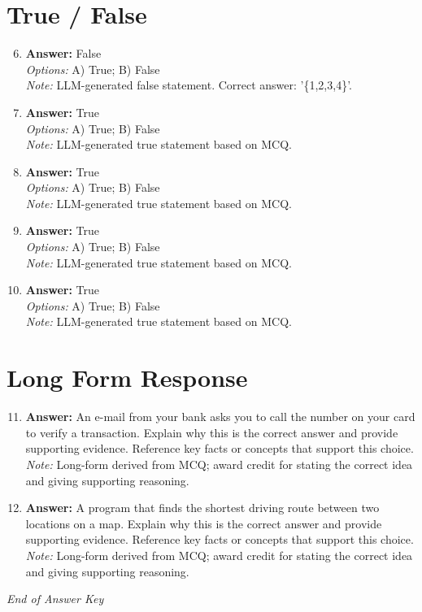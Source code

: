 \documentclass[12pt]{article}
\begin{document}
\section*{True / False}
\begin{enumerate}[label=\arabic*.]
\setcounter{enumi}{5}
\item \textbf{Answer:} False
\\ \textit{Options:} A) True; B) False
\\ \textit{Note:} LLM-generated false statement. Correct answer: '\{1,2,3,4\}'.
\item \textbf{Answer:} True
\\ \textit{Options:} A) True; B) False
\\ \textit{Note:} LLM-generated true statement based on MCQ.
\item \textbf{Answer:} True
\\ \textit{Options:} A) True; B) False
\\ \textit{Note:} LLM-generated true statement based on MCQ.
\item \textbf{Answer:} True
\\ \textit{Options:} A) True; B) False
\\ \textit{Note:} LLM-generated true statement based on MCQ.
\item \textbf{Answer:} True
\\ \textit{Options:} A) True; B) False
\\ \textit{Note:} LLM-generated true statement based on MCQ.
\end{enumerate}

\section*{Long Form Response}
\begin{enumerate}[label=\arabic*.]
\setcounter{enumi}{10}
\item \textbf{Answer:} An e-mail from your bank asks you to call the number on your card to verify a transaction. Explain why this is the correct answer and provide supporting evidence. Reference key facts or concepts that support this choice.
\\ \textit{Note:} Long-form derived from MCQ; award credit for stating the correct idea and giving supporting reasoning.
\item \textbf{Answer:} A program that finds the shortest driving route between two locations on a map. Explain why this is the correct answer and provide supporting evidence. Reference key facts or concepts that support this choice.
\\ \textit{Note:} Long-form derived from MCQ; award credit for stating the correct idea and giving supporting reasoning.
\end{enumerate}

\vfill
\noindent\textit{End of Answer Key}
\end{document}
